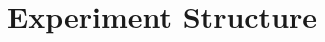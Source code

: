 \documentclass[../main.tex]{subfiles}
\begin{document}
\section{Experiment Structure}
\end{document}
